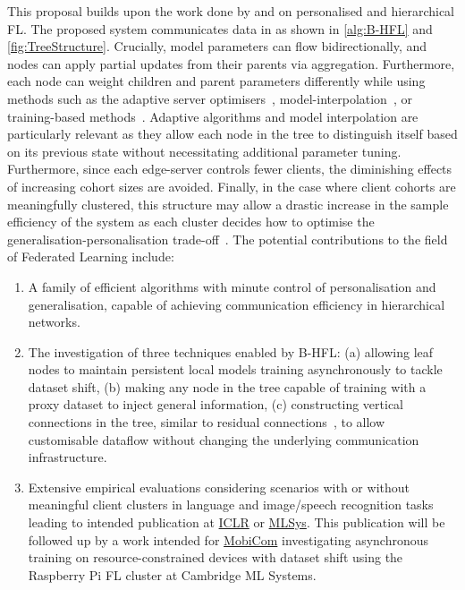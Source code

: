 This proposal builds upon the work done by \citet{EuroMLSysWorkshop} and \citet{OperaWorkshop} on personalised and hierarchical FL. The proposed system communicates data in as shown in \cref{alg:B-HFL} and \cref{fig:TreeStructure}. Crucially, model parameters can flow bidirectionally, and nodes can apply partial updates from their parents via aggregation. Furthermore, each node can weight children and parent parameters differently while using methods such as the adaptive server optimisers~\citep{FedOPT}, model-interpolation~\citep{AdaptivePersonalisedFederatedLearning,FederatedLearningMixtureOfGlobalAndLocal}, or training-based methods~\citep{Ditto,EWC,DeepMutualLearning,PersonalisedFLFirstOrder}. Adaptive algorithms and model interpolation are particularly relevant as they allow each node in the tree to distinguish itself based on its previous state without necessitating additional parameter tuning. Furthermore, since each edge-server controls fewer clients, the diminishing effects of increasing cohort sizes are avoided.  Finally, in the case where client cohorts are meaningfully clustered, this structure may allow a drastic increase in the sample efficiency of the system as each cluster decides how to optimise the generalisation-personalisation trade-off~\citep{PersonalisationGeneralisationTradeoff,Auxo}. The potential contributions to the field of Federated Learning include:
\begin{enumerate}
    \item A family of efficient algorithms with minute control of personalisation and generalisation, capable of achieving communication efficiency in hierarchical networks.
    \item The investigation of three techniques enabled by B-HFL\@: (a) allowing leaf nodes to maintain persistent local models training asynchronously to tackle dataset shift, (b) making any node in the tree capable of training with a proxy dataset to inject general information, (c) constructing  vertical connections in the tree, similar to residual connections~\citep{ResNet}, to allow customisable dataflow without changing the underlying communication infrastructure.
    \item Extensive empirical evaluations considering scenarios with or without meaningful client clusters in language and image/speech recognition tasks leading to intended publication at \href{https://iclr.cc/}{ICLR} or \href{https://mlsys.org/}{MLSys}. This publication will be followed up by a work intended for \href{https://sigmobile.org/mobicom/2023/}{MobiCom} investigating asynchronous training on resource-constrained devices with dataset shift using the Raspberry Pi FL cluster at Cambridge ML Systems.
\end{enumerate}









